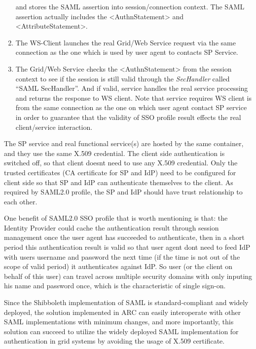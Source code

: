 \documentclass{article}
\begin{document}
\begin{enumerate}
and stores the SAML assertion into session/connection context. The SAML
assertion actually includes the {\textless}AuthnStatement{\textgreater}
and {\textless}AttributeStatement{\textgreater}.
\item The WS-Client launches the real Grid/Web Service request via the
same connection as the one which is used by user agent to contacts SP
Service.
\item The Grid/Web Service checks the
{\textless}AuthnStatement{\textgreater} from the session context to see
if the session is still valid through the \textit{SecHandler} called
{\textquotedblleft}SAML SecHandler{\textquotedblright}. And if valid,
service handles the real service processing and returns the response to
WS client. Note that service requires WS client is from the same
connection as the one on which user agent contact SP service in order
to guarantee that the validity of SSO profile result effects the real
client/service interaction.
\end{enumerate}
The SP service and real functional service(s) are hosted by the same
container, and they use the same X.509 credential. The client side
authentication is switched off, so that client doesn{\textquotesingle}t
need to use any X.509 credential. Only the trusted certificates (CA
certificate for SP and IdP) need to be configured for client side so
that SP and IdP can authenticate themselves to the client. As required
by SAML2.0 profile, the SP and IdP should have trust relationship to
each other.

One benefit of SAML2.0 SSO profile that is worth mentioning is that: the
Identity Provider could cache the authentication result through session
management once the user agent has succeeded to authenticate, then in a
short period this authentication result is valid so that user agent
don{\textquotesingle}t need to feed IdP with user{\textquotesingle}s
username and password the next time (if the time is not out of the
scope of valid period) it authenticates against IdP. So user (or the
client on behalf of this user) can travel across multiple security
domains with only inputing his name and password once, which is the
characteristic of single sign-on.

Since the Shibboleth implementation of SAML is standard-compliant and
widely deployed, the solution implemented in ARC can easily
interoperate with other SAML implementations with minimum changes, and
more importantly, this solution can succeed to utilize the widely
deployed SAML implementation for authentication in grid systems by
avoiding the usage of X.509 certificate.
\end{document}
